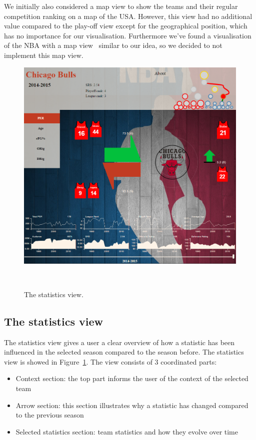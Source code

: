 \documentclass[]{sigchi}
\begin{document}

We initially also considered a map view to show the teams and their regular
competition ranking on a map of the USA. However, this view had no additional
value compared to the play-off view except for the geographical position, which
has no importance for our visualisation. Furthermore we've found a visualisation
of the NBA with a map view~\cite{mapviewvisualization} similar to our idea, so
we decided to not implement this map view. 

\begin{figure}
\centering
  \includegraphics[width=1.0\columnwidth]{figures/statisticsview}
  \caption{The statistics view.}~\label{fig:statisticsview}
\end{figure}

\subsection{The statistics view}
The statistics view gives a user a clear overview of how a statistic has been
influenced in the selected season compared to the season before. The statistics
view is showed in Figure~\ref{fig:statisticsview}. The view consists of 3
coordinated parts:
\begin{itemize}
    \item Context section: the top part informs the user of the context of the
        selected team
    \item Arrow section: this section illustrates why a statistic has changed
        compared to the previous season
    \item Selected statistics section: team statistics and how they evolve over
        time
\end{itemize}
\end{document}
